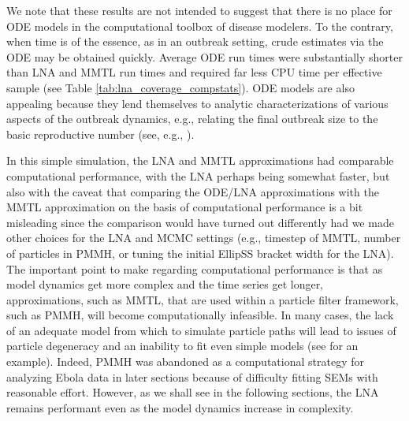 We note that these results are not intended to suggest that there is no place for ODE models in the computational toolbox of disease modelers. To the contrary, when time is of the essence, as in an outbreak setting, crude estimates via the ODE may be obtained quickly. Average ODE run times were substantially shorter than LNA and MMTL run times and required far less CPU time per effective sample (see Table \ref{tab:lna_coverage_compstats}). ODE models are also appealing because they lend themselves to analytic characterizations of various aspects of the outbreak dynamics, e.g., relating the final outbreak size to the basic reproductive number (see, e.g., \cite{andersson2000stochastic,britton2018,keeling2008}).

In this simple simulation, the LNA and MMTL approximations had comparable computational performance, with the LNA perhaps being somewhat faster, but also with the caveat that comparing the ODE/LNA approximations with the MMTL approximation on the basis of computational performance is a bit misleading since the comparison would have turned out differently had we made other choices for the LNA and MCMC settings (e.g., timestep of MMTL, number of particles in PMMH, or tuning the initial EllipSS bracket width for the LNA). The important point to make regarding computational performance is that as model dynamics get more complex and the time series get longer, approximations, such as MMTL, that are used within a particle filter framework, such as PMMH, will become computationally infeasible. In many cases, the lack of an adequate model from which to simulate particle paths will lead to issues of particle degeneracy and an inability to fit even simple models (see \cite{fintzi2017efficient} for an example). Indeed, PMMH was abandoned as a computational strategy for analyzing Ebola data in later sections because of difficulty fitting SEMs with reasonable effort. However, as we shall see in the following sections, the LNA remains performant even as the model dynamics increase in complexity. 
 

